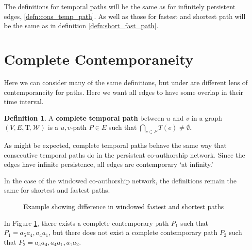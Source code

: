 \documentclass{article}
\theoremstyle{definition}
\newtheorem{defn}[thm]{Definition}
\numberwithin{thm}{subsection}
\newcommand{\W}{\mathcal{W}}
\newcommand{\T}{\text{T}}
\begin{document}
The definitions for temporal paths will be the same as for infinitely persistent
edges, \ref{defn:cons_temp_path}. As well as those for fastest and shortest path
will be the same as in definition \ref{defn:short_fast_path}.

\section{Complete Contemporaneity}

Here we can consider many of the same definitions, but under are different
lens of contemporaneity for paths. Here we want all edges to have some overlap
in their time interval.

\begin{defn}
  A \textbf{complete temporal path} between $u$ and $v$ in a graph $(V,E, \T,\W)$
  is a $u,v$-path $P \in E$ such that $\bigcap_{e \in P} T(e) \neq \emptyset$.
\end{defn}

As might be expected, complete temporal paths behave the same way
that consecutive temporal paths do in the persistent co-authorship network.
Since the edges have infinite persistence, all edges are contemporary `at
infinity.'

In the case of the windowed co-authorship network, the definitions remain the
same for shortest and fastest paths.

\begin{figure}[h] \centering
  \caption{Example showing difference in windowed fastest and shortest paths}
  \label{fig:windowed_path_ex}
\end{figure}

In Figure \ref{fig:windowed_path_ex}, there exists a complete contemporary path
$P_1$ such that $P_1 = a_5a_4,a_4a_1$, but there does not exist a complete
contemporary path $P_2$ such that $P_2 = a_5a_4,a_4a_1,a_1a_2$.
\end{document}
